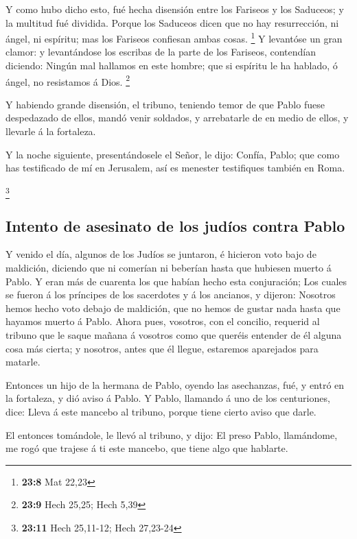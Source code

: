 Y como hubo dicho esto, fué hecha disensión entre los
Fariseos y los Saduceos; y la multitud fué dividida. 
Porque los Saduceos dicen que no hay resurrección, ni ángel, ni
espíritu; mas los Fariseos confiesan ambas cosas. \footnote{\textbf{23:8}
  Mat 22,23}  Y levantóse un gran clamor: y levantándose
los escribas de la parte de los Fariseos, contendían diciendo: Ningún
mal hallamos en este hombre; que si espíritu le ha hablado, ó ángel, no
resistamos á Dios. \footnote{\textbf{23:9} Hech 25,25; Hech 5,39}

 Y habiendo grande disensión, el tribuno, teniendo temor
de que Pablo fuese despedazado de ellos, mandó venir soldados, y
arrebatarle de en medio de ellos, y llevarle á la fortaleza.

 Y la noche siguiente, presentándosele el Señor, le dijo:
Confía, Pablo; que como has testificado de mí en Jerusalem, así es
menester testifiques también en Roma.

\footnote{\textbf{23:11} Hech 25,11-12; Hech 27,23-24}

\hypertarget{intento-de-asesinato-de-los-juduxedos-contra-pablo}{%
\subsection{Intento de asesinato de los judíos contra
Pablo}\label{intento-de-asesinato-de-los-juduxedos-contra-pablo}}

 Y venido el día, algunos de los Judíos se juntaron, é
hicieron voto bajo de maldición, diciendo que ni comerían ni beberían
hasta que hubiesen muerto á Pablo.  Y eran más de
cuarenta los que habían hecho esta conjuración;  Los
cuales se fueron á los príncipes de los sacerdotes y á los ancianos, y
dijeron: Nosotros hemos hecho voto debajo de maldición, que no hemos de
gustar nada hasta que hayamos muerto á Pablo.  Ahora
pues, vosotros, con el concilio, requerid al tribuno que le saque mañana
á vosotros como que queréis entender de él alguna cosa más cierta; y
nosotros, antes que él llegue, estaremos aparejados para matarle.

 Entonces un hijo de la hermana de Pablo, oyendo las
asechanzas, fué, y entró en la fortaleza, y dió aviso á Pablo.
 Y Pablo, llamando á uno de los centuriones, dice: Lleva
á este mancebo al tribuno, porque tiene cierto aviso que darle.

 El entonces tomándole, le llevó al tribuno, y dijo: El
preso Pablo, llamándome, me rogó que trajese á ti este mancebo, que
tiene algo que hablarte.

